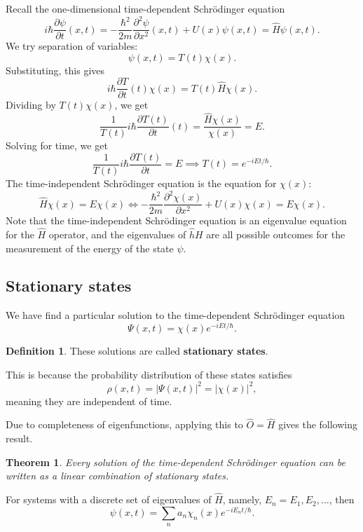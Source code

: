\documentclass[12pt]{article}
\newtheorem{theorem}{Theorem}[section]
\theoremstyle{definition}
\newtheorem{definition}{Definition}[section]
\theoremstyle{remark}
\begin{document}
Recall the one-dimensional time-dependent Schr\"{o}dinger equation
\[
	i \hbar \frac{\partial \psi}{\partial t}(x, t) = -\frac{\hbar^2}{2m} \frac{\partial^2 \psi}{\partial x^2} (x, t) + U(x) \psi(x, t) = \hat H \psi(x, t)
.\] 
We try separation of variables:
\[
	\psi(x, t) = T(t) \chi(x)
.\]
Substituting, this gives
\[
	i \hbar \frac{\partial T}{\partial t}(t) \chi(x) = T(t) \hat H \chi(x)
.\]
Dividing by $T(t)\chi(x)$, we get
\[
	\frac{1}{T(t)} i \hbar \frac{\partial T (t)}{\partial t}(t) = \frac{\hat H \chi (x)}{\chi(x)} = E
.\]
Solving for time, we get
\[
	\frac{1}{T(t)} i \hbar \frac{\partial T(t)}{\partial t} = E \implies T(t) = e^{-i E t/\hbar}
.\]
The time-independent Schr\"{o}dinger equation is the equation for $\chi(x)$:
\[
	\hat H \chi(x) = E \chi(x) \iff - \frac{\hbar^2}{2m} \frac{\partial^2 \chi(x)}{\partial x^2} + U(x) \chi(x) = E \chi(x)
.\]
Note that the time-independent Schr\"{o}dinger equation is an eigenvalue equation for the $\hat H$ operator, and the eigenvalues of $\hat hH$ are all possible outcomes for the measurement of the energy of the state $\psi$.

\subsection{Stationary states}%
\label{sub:stationary_states}

We have find a particular solution to the time-dependent Schr\"{o}dinger equation
\[
	\Psi(x, t) = \chi(x) e^{-iEt/\hbar}
.\]

\begin{definition}
	These solutions are called \textbf{stationary states}.
\end{definition}

This is because the probability distribution of these states satisfies
\[
	\rho(x, t) = |\Psi(x, t)|^2 = |\chi(x)|^2
,\]
meaning they are independent of time.

Due to completeness of eigenfunctions, applying this to $\hat O = \hat H$ gives the following result.

\begin{theorem}
	Every solution of the time-dependent Schr\"{o}dinger equation can be written as a linear combination of stationary states.
\end{theorem}

For systems with a discrete set of eigenvalues of $\hat H$, namely, $E_n = E_1, E_2, \ldots$, then
\[
	\psi(x, t) = \sum_{n} a_n \chi_n(x) e^{-iE_n t/\hbar}
.\]
\end{document}

